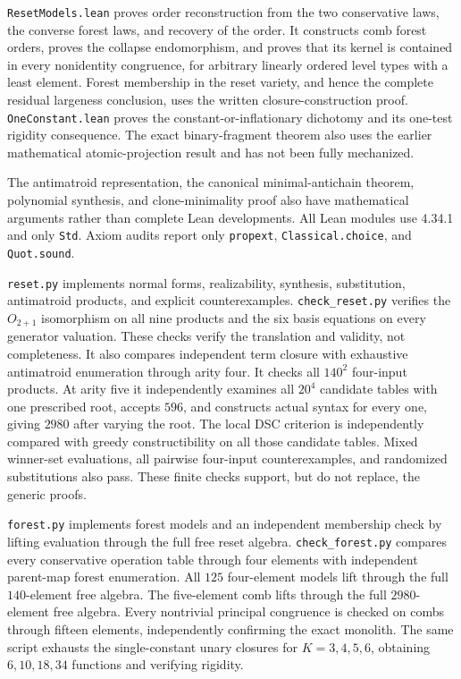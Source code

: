 \documentclass[11pt]{article}
\begin{document}
\texttt{ResetModels.lean} proves order reconstruction from the two
conservative laws, the converse forest laws, and recovery of the order.
It constructs comb forest orders, proves the collapse endomorphism,
and proves that its kernel is contained in every nonidentity congruence,
for arbitrary linearly ordered level types with a least element.
Forest membership in the reset variety, and hence the complete residual
largeness conclusion, uses the written closure-construction proof.
\texttt{OneConstant.lean} proves the constant-or-inflationary dichotomy
and its one-test rigidity consequence. The exact binary-fragment theorem
also uses the earlier mathematical atomic-projection result and has not
been fully mechanized.

The antimatroid representation, the canonical minimal-antichain
theorem, polynomial synthesis, and clone-minimality proof also have
mathematical arguments rather than complete Lean developments.
All Lean modules use 4.34.1 and only \texttt{Std}. Axiom audits report
only \texttt{propext}, \texttt{Classical.choice}, and \texttt{Quot.sound}.

\texttt{reset.py} implements normal forms, realizability, synthesis,
substitution, antimatroid products, and explicit counterexamples.
\texttt{check\_reset.py} verifies the $O_{2+1}$ isomorphism on all nine
products and the six basis equations on every generator valuation.
These checks verify the translation and validity, not completeness.
It also compares independent term closure with exhaustive
antimatroid enumeration through arity four. It checks all $140^2$
four-input products. At arity five it independently examines all
$20^4$ candidate tables with one prescribed root, accepts $596$, and
constructs actual syntax for every one, giving $2980$ after varying the
root. The local DSC criterion is independently compared with greedy
constructibility on all those candidate tables. Mixed winner-set evaluations, all pairwise four-input
counterexamples, and randomized substitutions also pass. These finite
checks support, but do not replace, the generic proofs.

\texttt{forest.py} implements forest models and an independent membership
check by lifting evaluation through the full free reset algebra.
\texttt{check\_forest.py} compares every conservative operation table
through four elements with independent parent-map forest enumeration.
All $125$ four-element models lift through the full $140$-element free
algebra. The five-element comb lifts through the full $2980$-element
free algebra. Every nontrivial principal congruence is checked on combs
through fifteen elements, independently confirming the exact monolith.
The same script exhausts the single-constant unary closures for
$K=3,4,5,6$, obtaining $6,10,18,34$ functions and verifying rigidity.
\end{document}
